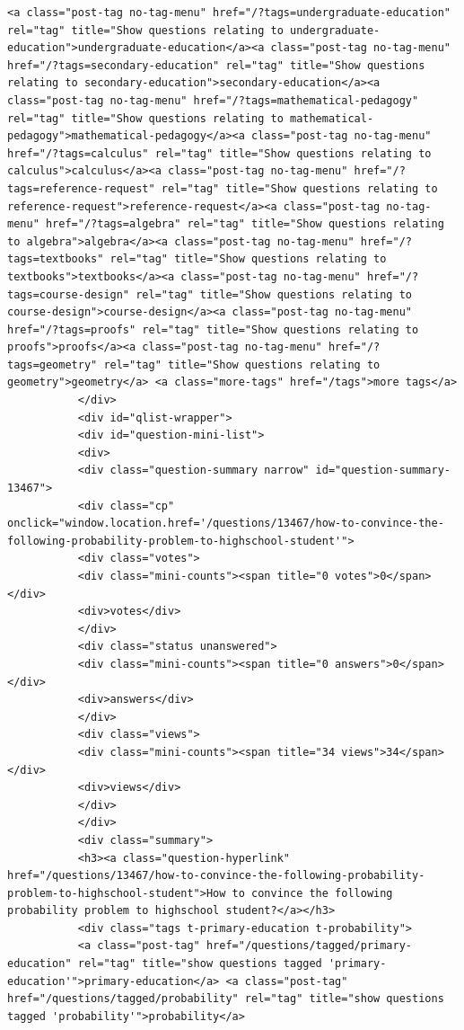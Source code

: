 \documentclass[11pt]{article}
\begin{document}
\begin{Verbatim}[commandchars=\\\{\}]
           <a class="post-tag no-tag-menu" href="/?tags=undergraduate-education" rel="tag" title="Show questions relating to undergraduate-education">undergraduate-education</a><a class="post-tag no-tag-menu" href="/?tags=secondary-education" rel="tag" title="Show questions relating to secondary-education">secondary-education</a><a class="post-tag no-tag-menu" href="/?tags=mathematical-pedagogy" rel="tag" title="Show questions relating to mathematical-pedagogy">mathematical-pedagogy</a><a class="post-tag no-tag-menu" href="/?tags=calculus" rel="tag" title="Show questions relating to calculus">calculus</a><a class="post-tag no-tag-menu" href="/?tags=reference-request" rel="tag" title="Show questions relating to reference-request">reference-request</a><a class="post-tag no-tag-menu" href="/?tags=algebra" rel="tag" title="Show questions relating to algebra">algebra</a><a class="post-tag no-tag-menu" href="/?tags=textbooks" rel="tag" title="Show questions relating to textbooks">textbooks</a><a class="post-tag no-tag-menu" href="/?tags=course-design" rel="tag" title="Show questions relating to course-design">course-design</a><a class="post-tag no-tag-menu" href="/?tags=proofs" rel="tag" title="Show questions relating to proofs">proofs</a><a class="post-tag no-tag-menu" href="/?tags=geometry" rel="tag" title="Show questions relating to geometry">geometry</a> <a class="more-tags" href="/tags">more tags</a>
           </div>
           <div id="qlist-wrapper">
           <div id="question-mini-list">
           <div>
           <div class="question-summary narrow" id="question-summary-13467">
           <div class="cp" onclick="window.location.href='/questions/13467/how-to-convince-the-following-probability-problem-to-highschool-student'">
           <div class="votes">
           <div class="mini-counts"><span title="0 votes">0</span></div>
           <div>votes</div>
           </div>
           <div class="status unanswered">
           <div class="mini-counts"><span title="0 answers">0</span></div>
           <div>answers</div>
           </div>
           <div class="views">
           <div class="mini-counts"><span title="34 views">34</span></div>
           <div>views</div>
           </div>
           </div>
           <div class="summary">
           <h3><a class="question-hyperlink" href="/questions/13467/how-to-convince-the-following-probability-problem-to-highschool-student">How to convince the following probability problem to highschool student?</a></h3>
           <div class="tags t-primary-education t-probability">
           <a class="post-tag" href="/questions/tagged/primary-education" rel="tag" title="show questions tagged 'primary-education'">primary-education</a> <a class="post-tag" href="/questions/tagged/probability" rel="tag" title="show questions tagged 'probability'">probability</a>

\end{Verbatim}
\end{document}
